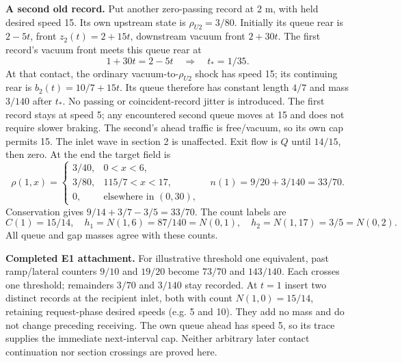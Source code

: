 \documentclass[11pt,a4paper]{article}
\begin{document}
\textbf{A second old record.} Put another zero-passing record at 2 m, with
held desired speed 15. Its own upstream state is $\rho_{U2}=3/80$.
Initially its queue rear is $2-5t$, front $z_2(t)=2+15t$, downstream vacuum
front $2+30t$. The first record's vacuum front meets this queue rear at
\begin{equation}
 1+30t=2-5t\quad\Longrightarrow\quad t_*=1/35.
\end{equation}
At that contact, the ordinary vacuum-to-$\rho_{U2}$ shock has speed 15;
its continuing rear is $b_2(t)=10/7+15t$. Its queue therefore has constant
length $4/7$ and mass $3/140$ after $t_*$. No passing or coincident-record
jitter is introduced. The first record stays at speed 5; any encountered
second queue moves at 15 and does not require slower braking. The second's
ahead traffic is free/vacuum, so its own cap permits 15. The inlet wave in
section 2 is unaffected. Exit flow is $Q$ until $14/15$, then zero.
At the end the target field is
\begin{equation}
 \rho(1,x)=\begin{cases}
 3/40,&0<x<6,\\3/80,&115/7<x<17,\\0,&\text{elsewhere in }(0,30),
 \end{cases}
 \quad n(1)=9/20+3/140=33/70.
\end{equation}
Conservation gives $9/14+3/7-3/5=33/70$. The count labels are
\begin{equation}
 C(1)=15/14,\quad h_1=N(1,6)=87/140=N(0,1),\quad
 h_2=N(1,17)=3/5=N(0,2).
\end{equation}
All queue and gap masses agree with these counts.

\textbf{Completed E1 attachment.} For illustrative threshold one equivalent,
past ramp/lateral counters $9/10$ and $19/20$ become $73/70$ and $143/140$.
Each crosses one threshold; remainders $3/70$ and $3/140$ stay recorded.
At $t=1$ insert two distinct records at the recipient inlet, both with count
$N(1,0)=15/14$, retaining request-phase desired speeds (e.g. 5 and 10).
They add no mass and do not change preceding receiving. The own queue ahead
has speed 5, so its trace supplies the immediate next-interval cap. Neither
arbitrary later contact continuation nor section crossings are proved here.

\newpage
\end{document}
